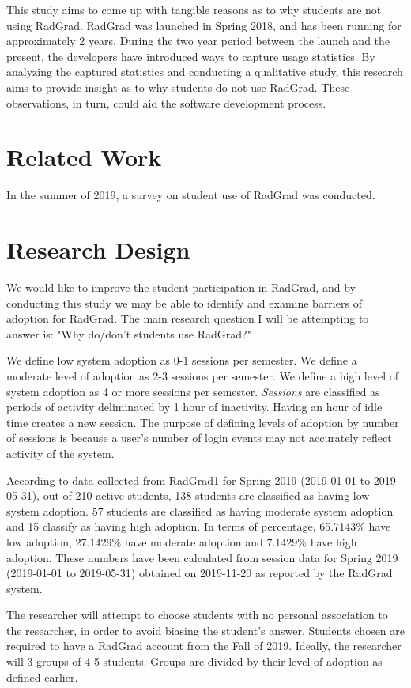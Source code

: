 \documentclass[english]{proposalnsf}
\begin{document}
This study aims to come up with tangible reasons as to why students are not using RadGrad. RadGrad was launched in Spring 2018, and has been running for approximately 2 years. During the two year period between the launch and the present, the developers have introduced ways to capture usage statistics. By analyzing the captured statistics and conducting a qualitative study, this research aims to provide insight as to why students do not use RadGrad. These observations, in turn, could aid the software development process. 

\section{Related Work}
\label{related-work}

In the summer of 2019, a survey on student use of RadGrad was conducted. 
\section{Research Design}
\label{research-design}

We would like to improve the student participation in RadGrad, and by conducting this study we may be able to identify and examine barriers of adoption for RadGrad. The main research question I will be attempting to answer is: "Why do/don't students use RadGrad?"

We define low system adoption as 0-1 sessions per semester. We define a moderate level of adoption as 2-3 sessions per semester.  We define a high level of system adoption as 4 or more sessions per semester. 
{\em Sessions} are classified as periods of activity deliminated by 1 hour of inactivity. Having an hour of idle time creates a new session. The purpose of defining levels of adoption by number of sessions is because a user's number of login events may not accurately reflect activity of the system. 

According to data collected from RadGrad1 for Spring 2019 (2019-01-01 to 2019-05-31), out of 210 active students, 138 students are classified as having low system adoption. 57 students are classified as having moderate system adoption and 15 classify as having high adoption. In terms of percentage, 65.7143{\%} have low adoption, 27.1429{\%} have moderate adoption and 7.1429{\%} have high adoption. These numbers have been calculated from session data for Spring 2019 (2019-01-01 to 2019-05-31) obtained on 2019-11-20 as reported by the RadGrad system. 

The researcher will attempt to choose students with no personal association to the researcher, in order to avoid biasing the student’s answer. Students chosen are required to have a RadGrad account from the Fall of 2019. Ideally, the researcher will 3 groups of 4-5 students. Groups are divided by their level of adoption as defined earlier. 
 
\end{document}

